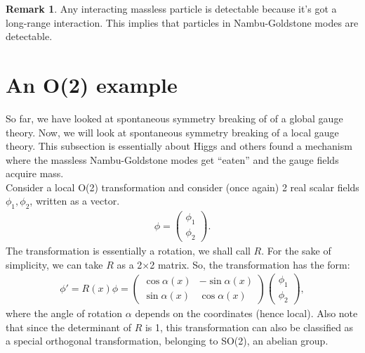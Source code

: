 \documentclass{book}
\numberwithin{equation}{section}
\theoremstyle{definition}
\newtheorem{rmk}{Remark}[section]
\begin{document}
\begin{rmk}
	Any interacting massless particle is detectable because it's got a long-range interaction. This implies that particles in Nambu-Goldstone modes are detectable. 
\end{rmk}

\section{An O(2) example}
So far, we have looked at spontaneous symmetry breaking of of a global gauge theory. Now, we will look at spontaneous symmetry breaking of a local gauge theory. This subsection is essentially about Higgs and others found a mechanism where the massless Nambu-Goldstone modes get ``eaten'' and the gauge fields acquire mass. \\

Consider a local O(2) transformation and consider (once again) 2 real scalar fields $\phi_1, \phi_2$, written as a vector.
\begin{align}
\phi = \begin{pmatrix}
\phi_1 \\ \phi_2
\end{pmatrix}.
\end{align}
The transformation is essentially a rotation, we shall call $R$. For the sake of simplicity, we can take $R$ as a 2$\times$2 matrix. So, the transformation has the form:
\begin{align}
\phi' = R(x)\phi = \begin{pmatrix}
\cos\alpha(x)&-\sin\alpha(x)\\\sin\alpha(x)&\cos\alpha(x)
\end{pmatrix}\begin{pmatrix}
\phi_1 \\ \phi_2
\end{pmatrix},
\end{align}
where the angle of rotation $\alpha$ depends on the coordinates (hence local). Also note that since the determinant of $R$ is 1, this transformation can also be classified as a special orthogonal transformation, belonging to SO(2), an abelian group.\\
\end{document}
